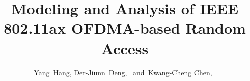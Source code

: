 \documentclass[journal]{IEEEtran}
\begin{document}
%
\title{Modeling and Analysis of IEEE 802.11ax OFDMA-based Random Access}
%
%
%

\author{Yang~Hang,
        Der-Jiunn~Deng,~ 
        and~Kwang-Cheng Chen,~%
}

% 
%
\end{document}
